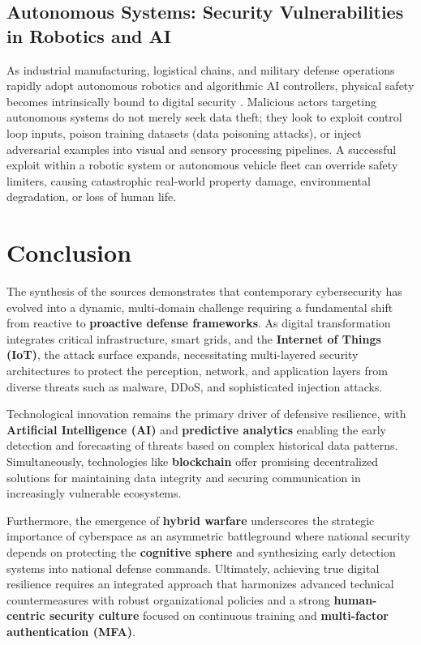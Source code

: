 \documentclass[11pt,a4paper]{article}
\begin{document}
\subsection{Autonomous Systems: Security Vulnerabilities in Robotics and AI}
As industrial manufacturing, logistical chains, and military defense operations rapidly adopt autonomous robotics and algorithmic AI controllers, physical safety becomes intrinsically bound to digital security \cite{b1, b6}. Malicious actors targeting autonomous systems do not merely seek data theft; they look to exploit control loop inputs, poison training datasets (data poisoning attacks), or inject adversarial examples into visual and sensory processing pipelines. A successful exploit within a robotic system or autonomous vehicle fleet can override safety limiters, causing catastrophic real-world property damage, environmental degradation, or loss of human life.


\section{Conclusion}

The synthesis of the sources demonstrates that contemporary cybersecurity has evolved into a dynamic, multi-domain challenge requiring a fundamental shift from reactive to \textbf{proactive defense frameworks}. As digital transformation integrates critical infrastructure, smart grids, and the \textbf{Internet of Things (IoT)}, the attack surface expands, necessitating multi-layered security architectures to protect the perception, network, and application layers from diverse threats such as malware, DDoS, and sophisticated injection attacks. 

Technological innovation remains the primary driver of defensive resilience, with \textbf{Artificial Intelligence (AI)} and \textbf{predictive analytics} enabling the early detection and forecasting of threats based on complex historical data patterns. Simultaneously, technologies like \textbf{blockchain} offer promising decentralized solutions for maintaining data integrity and securing communication in increasingly vulnerable ecosystems. 

Furthermore, the emergence of \textbf{hybrid warfare} underscores the strategic importance of cyberspace as an asymmetric battleground where national security depends on protecting the \textbf{cognitive sphere} and synthesizing early detection systems into national defense commands. Ultimately, achieving true digital resilience requires an integrated approach that harmonizes advanced technical countermeasures with robust organizational policies and a strong \textbf{human-centric security culture} focused on continuous training and \textbf{multi-factor authentication (MFA)}.

\newpage


\end{document}

